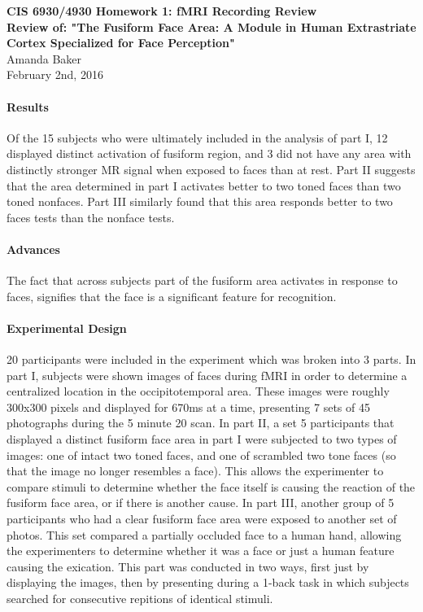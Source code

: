 \documentclass[11pt]{article}
\begin{document}
\begin{center}
{\large {\bf CIS 6930/4930 Homework 1: fMRI Recording Review}}\\
{\normalsize {\bf Review of: "The Fusiform Face Area: A Module in Human Extrastriate Cortex
Specialized for Face Perception"}}\\
Amanda Baker \\
February 2nd, 2016 \\
\end{center}

\paragraph{Results}
Of the 15 subjects who were ultimately included in the analysis of part I, 12 displayed
distinct activation of fusiform region, and 3 did not have any area with distinctly
stronger MR signal when exposed to faces than at rest.  Part II suggests that the
area determined in part I activates better to two toned faces than two toned nonfaces.
Part III similarly found that this area responds better to two faces tests than
the nonface tests.

\paragraph{Advances}
The fact that across subjects part of the fusiform area activates in response to
faces, signifies that the face is a significant feature for recognition.

\paragraph{Experimental Design}
20 participants were included in the experiment which was broken into 3 parts. In
part I, subjects were shown images of faces during fMRI in order to determine a
centralized location in the occipitotemporal area. These images were roughly 300x300
pixels and displayed for 670ms at a time, presenting 7 sets of 45 photographs during
the 5 minute 20 scan.  In part II, a set 5 participants that displayed a distinct fusiform
face area in part I were subjected to two types of images: one of intact two toned
faces, and one of scrambled two tone faces (so that the image no longer resembles
a face).  This allows the experimenter to compare stimuli to determine whether the
face itself is causing the reaction of the fusiform face area, or if there is another
cause.  In part III, another group of 5 participants who had a clear fusiform face
area were exposed to another set of photos.  This set compared a partially occluded
face to a human hand, allowing the experimenters to determine whether it was a face
or just a human feature causing the exication. This part was conducted in two ways,
first just by displaying the images, then by presenting during a 1-back task
in which subjects searched for consecutive repitions of identical stimuli.
\end{document}
